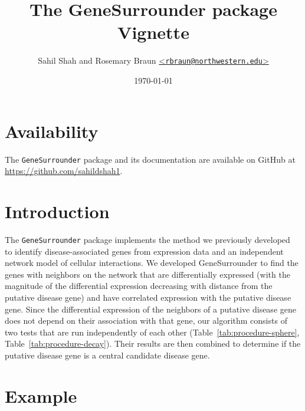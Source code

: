 \documentclass[11pt]{article}
\begin{document}

\title{\vspace{-1cm}The GeneSurrounder package Vignette}

\author{Sahil Shah and Rosemary Braun 
	   \href{mailto:rbraun@northwestern.edu}{<\texttt{rbraun@northwestern.edu}>}}

\date{\today}

\maketitle


\section*{Availability}  %

The \texttt{GeneSurrounder} package and its documentation are available on GitHub at 
\url{https://github.com/sahildshah1}. 


\section*{Introduction}  %

The \texttt{GeneSurrounder} package implements the method we previously developed~\cite{SHAH2017}
to identify disease-associated genes from expression data and an independent
network model of cellular interactions. We developed GeneSurrounder to find the genes
with neighbors on the network that are differentially expressed (with the
magnitude of the differential expression decreasing with distance from the
putative disease gene) and have correlated expression with the putative disease
gene. Since the differential expression of the neighbors of a putative disease
gene does not depend on their association with that gene, our algorithm consists
of two tests that are run independently of each other 
(Table~\ref{tab:procedure-sphere}, Table~\ref{tab:procedure-decay}). Their results
are then combined to determine if the putative disease gene is a central
candidate disease gene.

\section*{Example} %
\end{document}
